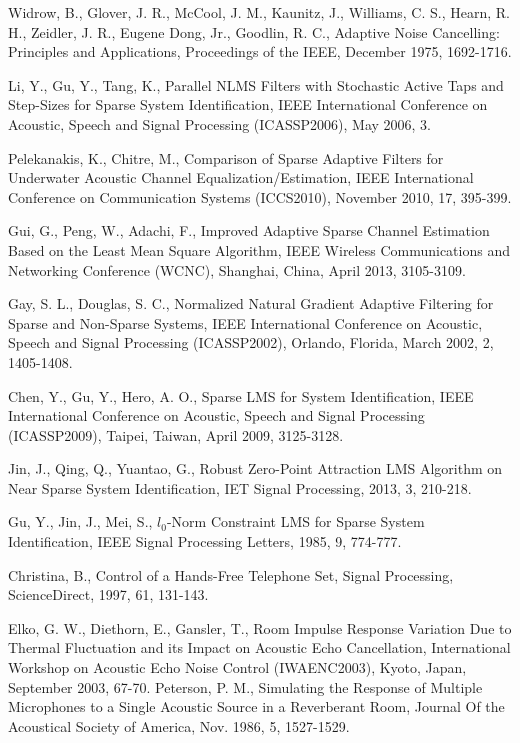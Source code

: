 Widrow, B., Glover, J. R., McCool, J. M., Kaunitz, J., Williams, C. S., Hearn, R. H., Zeidler, J. R., Eugene Dong, Jr., Goodlin, R. C., Adaptive Noise Cancelling: Principles and Applications, Proceedings of the IEEE, December 1975, 1692-1716.


 Li, Y., Gu, Y., Tang, K., Parallel NLMS Filters with Stochastic Active Taps and Step-Sizes for Sparse System Identiﬁcation, IEEE International Conference on  Acoustic, Speech and Signal Processing (ICASSP2006), May 2006, 3.
 
Pelekanakis, K., Chitre, M., Comparison of Sparse Adaptive Filters for Underwater Acoustic Channel Equalization/Estimation, IEEE International Conference on Communication Systems (ICCS2010), November 2010, 17, 395-399.

Gui, G., Peng, W., Adachi, F., Improved Adaptive Sparse Channel Estimation Based on the Least Mean Square Algorithm, IEEE Wireless Communications and Networking  Conference (WCNC), Shanghai, China, April 2013, 3105-3109.

Gay, S. L., Douglas, S. C., Normalized Natural Gradient Adaptive Filtering for Sparse and Non-Sparse Systems, IEEE International Conference on  Acoustic, Speech and Signal Processing (ICASSP2002), Orlando, Florida, March 2002, 2, 1405-1408.

Chen, Y., Gu, Y., Hero, A. O., Sparse LMS for System Identification, IEEE International Conference on  Acoustic, Speech and Signal Processing (ICASSP2009), Taipei, Taiwan, April 2009, 3125-3128.

Jin, J., Qing, Q., Yuantao, G., Robust Zero-Point Attraction LMS Algorithm on Near Sparse System Identification, IET Signal Processing, 2013, 3, 210-218.

Gu, Y., Jin, J., Mei, S., $l_0$-Norm Constraint LMS for Sparse System Identification, IEEE Signal Processing Letters, 1985, 9, 774-777.

Christina, B., Control of a Hands-Free Telephone Set, Signal Processing, ScienceDirect, 1997, 61, 131-143.

%
Elko, G. W., Diethorn, E., Gansler, T., Room Impulse Response Variation Due to Thermal Fluctuation and its Impact on Acoustic Echo Cancellation, International Workshop on Acoustic Echo Noise Control (IWAENC2003), Kyoto, Japan, September 2003, 67-70.
%
Peterson, P. M., Simulating the Response of Multiple Microphones to a Single Acoustic Source in a Reverberant Room, Journal Of the Acoustical Society of America, Nov. 1986, 5, 1527-1529.

